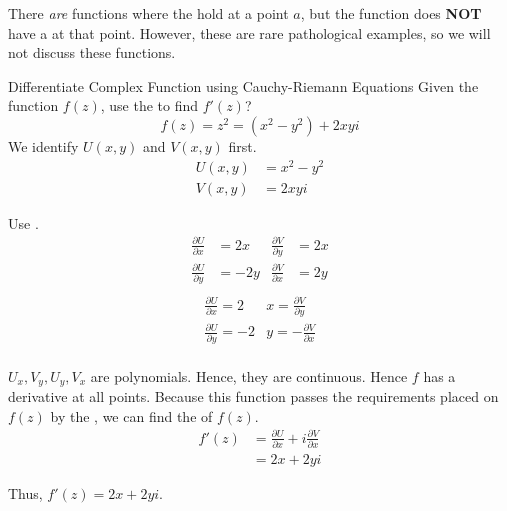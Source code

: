 \begin{remark*}
  There \textit{are} functions where the  hold at a point $a$, but the function does \textbf{NOT} have a  at that point.
  However, these are rare pathological examples, so we will not discuss these functions.
\end{remark*}

\begin{example}[Lecture 5]{Differentiate Complex Function using Cauchy-Riemann Equations}
  Given the function $f(z)$, use the  to find $f'(z)$?
  \begin{equation*}
    f(z) = z^{2} = \left( x^{2} - y^{2} \right) + 2xyi
  \end{equation*}
  \tcblower{}
  We identify $U(x, y)$ and $V(x, y)$ first.
  \begin{align*}
    U(x, y) &= x^{2} - y^{2} \\
    V(x, y) &= 2xyi
  \end{align*}

  Use .
  \begin{align*}
    \frac{\partial U}{\partial x} &= 2x & \frac{\partial V}{\partial y} &= 2x \\
    \frac{\partial U}{\partial y} &= -2y & \frac{\partial V}{\partial x} &= 2y \\
  \end{align*}
  \begin{align*}
    \frac{\partial U}{\partial x} = 2&x = \frac{\partial V}{\partial y} \\
    \frac{\partial U}{\partial y} = -2&y = -\frac{\partial V}{\partial x} \\
  \end{align*}

  $U_{x}, V_{y}, U_{y}, V_{x}$ are polynomials.
  Hence, they are continuous.
  Hence $f$ has a derivative at all points.
  Because this function passes the requirements placed on $f(z)$ by the , we can find the  of $f(z)$.
  \begin{align*}
    f'(z) &= \frac{\partial U}{\partial x} + i \frac{\partial V}{\partial x} \\
          &= 2x + 2yi
  \end{align*}

  Thus, $f'(z) = 2x + 2yi$.
\end{example}

